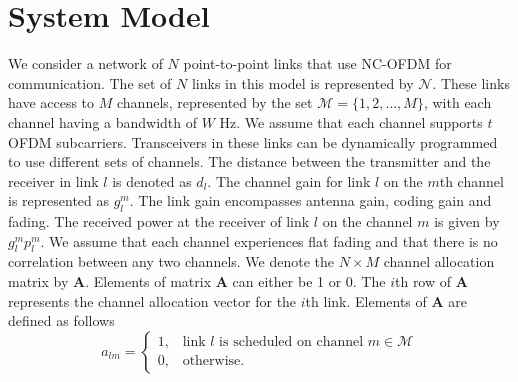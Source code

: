\documentclass[conference]{IEEEtran}
\begin{document}
\section{System Model}
\label{sec:sys}
We consider  a network of $N$ point-to-point links  that use NC-OFDM for communication. The set of $N$ links in this model is represented by $\mathcal{N}$. These links have access to $M$ channels, represented by the  set $\mathcal{M} = \{1,2,\ldots,M\}$, with each channel having a bandwidth of $W$ Hz. We assume that each channel supports $t$ OFDM subcarriers.  Transceivers in these links can be dynamically programmed to use different sets of channels.  The distance between the transmitter and the receiver in link $l$ is denoted as $d_l$. The channel gain  for link $l$ on the $m$th channel is represented as $g_l^m$. The link gain encompasses antenna gain, coding gain and fading. The received power at the receiver of link $l$ on the channel $m$ is given by $g_l^m p_l^m$.  We assume that each channel experiences flat fading and that there is no correlation between any two channels. 
We denote the $N\times M$ channel allocation matrix by  $\textbf{A}$. Elements of matrix $\textbf{A}$ can either be 1 or 0. The $i$th row of $\textbf{A}$ represents the channel allocation vector for the $i$th link. Elements of $\textbf{A}$ are defined  as follows\\
\begin{equation*}
	a_{lm}=\begin{cases}
    1, \;\;\;\text{link $l$ is scheduled on channel $m\in\mathcal{M}$}\\
    0,\;\;\;\text{otherwise.}
    \end{cases}
\end{equation*}
\end{document}
